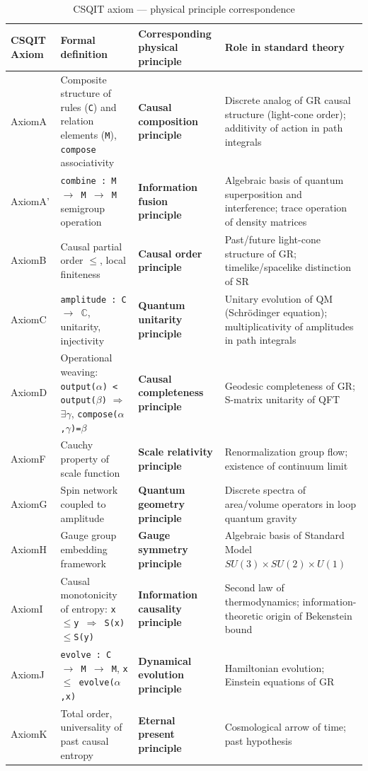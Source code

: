 \documentclass[aps,prd,twocolumn,nofootinbib,floatfix]{revtex4-2}
\begin{document}
\begin{table}[h]
\centering
\small
\begin{tabular}{|p{1.5cm}|p{3.5cm}|p{3.5cm}|p{4cm}|}
\hline
\textbf{CSQIT Axiom} & \textbf{Formal definition} & \textbf{Corresponding physical principle} & \textbf{Role in standard theory} \\
\hline
AxiomA & Composite structure of rules (\texttt{C}) and relation elements (\texttt{M}), \texttt{compose} associativity & \textbf{Causal composition principle} & Discrete analog of GR causal structure (light-cone order); additivity of action in path integrals \\
\hline
AxiomA' & \texttt{combine : M $\to$ M $\to$ M} semigroup operation & \textbf{Information fusion principle} & Algebraic basis of quantum superposition and interference; trace operation of density matrices \\
\hline
AxiomB & Causal partial order \texttt{$\leq$}, local finiteness & \textbf{Causal order principle} & Past/future light-cone structure of GR; timelike/spacelike distinction of SR \\
\hline
AxiomC & \texttt{amplitude : C $\to$ $\mathbb{C}$}, unitarity, injectivity & \textbf{Quantum unitarity principle} & Unitary evolution of QM (Schr\"odinger equation); multiplicativity of amplitudes in path integrals \\
\hline
AxiomD & Operational weaving: \texttt{output($\alpha$) < output($\beta$)} $\Rightarrow$ $\exists\gamma$, \texttt{compose($\alpha$,$\gamma$)=$\beta$} & \textbf{Causal completeness principle} & Geodesic completeness of GR; S-matrix unitarity of QFT \\
\hline
AxiomF & Cauchy property of scale function & \textbf{Scale relativity principle} & Renormalization group flow; existence of continuum limit \\
\hline
AxiomG & Spin network coupled to amplitude & \textbf{Quantum geometry principle} & Discrete spectra of area/volume operators in loop quantum gravity \\
\hline
AxiomH & Gauge group embedding framework & \textbf{Gauge symmetry principle} & Algebraic basis of Standard Model $SU(3)\times SU(2)\times U(1)$ \\
\hline
AxiomI & Causal monotonicity of entropy: \texttt{x$\leq$y $\Rightarrow$ S(x)$\leq$S(y)} & \textbf{Information causality principle} & Second law of thermodynamics; information-theoretic origin of Bekenstein bound \\
\hline
AxiomJ & \texttt{evolve : C $\to$ M $\to$ M}, \texttt{x $\leq$ evolve($\alpha$,x)} & \textbf{Dynamical evolution principle} & Hamiltonian evolution; Einstein equations of GR \\
\hline
AxiomK & Total order, universality of past causal entropy & \textbf{Eternal present principle} & Cosmological arrow of time; past hypothesis \\
\hline
\end{tabular}
\caption{CSQIT axiom --- physical principle correspondence}
\end{table}
\end{document}
